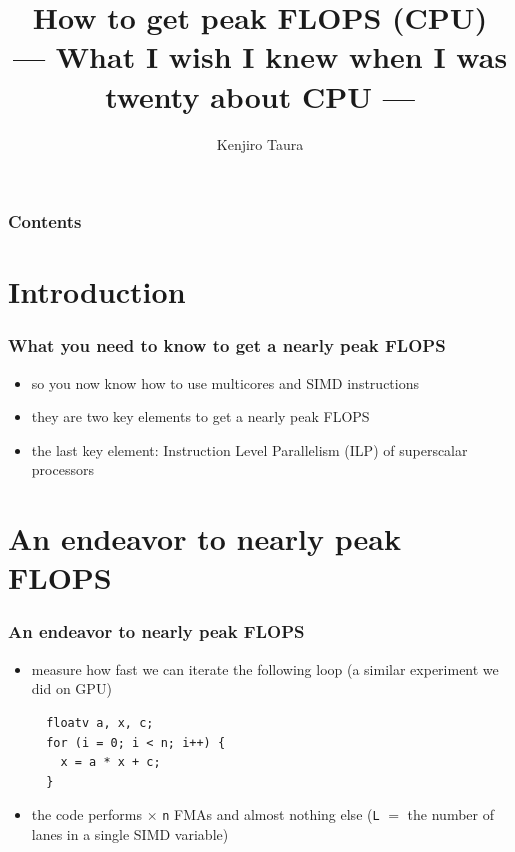 \documentclass[12pt,dvipdfmx]{beamer}
\title{How to get peak FLOPS (CPU) \\
  --- What I wish I knew when I was twenty about CPU ---}
\institute{}
\author{Kenjiro Taura}
\date{}
\newcommand{\ao}[1]{{\color{blue}#1}}
\begin{document}
\maketitle

\begin{frame}
\frametitle{Contents}
\tableofcontents
\end{frame}


\section{Introduction}

\begin{frame}
\frametitle{What you need to know to get a nearly peak FLOPS}
\begin{itemize}
\item so you now know how to use multicores and SIMD instructions

\item they are two key elements to get a nearly peak FLOPS

\item the last key element: \ao{Instruction Level Parallelism (ILP)}
  of superscalar processors
\end{itemize}
\end{frame}


\section{An endeavor to nearly peak FLOPS}
\begin{frame}[fragile]
\frametitle{An endeavor to nearly peak FLOPS}
\begin{itemize}
\item measure how fast we can iterate the following loop (a similar experiment we did on GPU)

\begin{lstlisting}
  floatv a, x, c;
  for (i = 0; i < n; i++) {
    x = a * x + c;
  }
\end{lstlisting}

\item the code performs \ao{{\tt L} $\times$ {\tt n}} FMAs and almost nothing else
  ({\tt L} $=$ the number of lanes in a single SIMD variable)
\end{itemize}
\end{frame}
\end{document}
